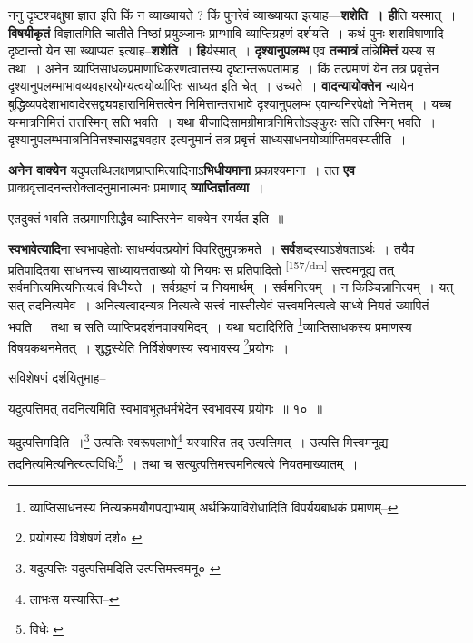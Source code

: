 \documentclass[article,12pt,a4paper]{memoir}
\begin{document}
	  \pstart ननु दृष्टश्चक्षुषा ज्ञात इति किं न व्याख्यायते ? किं पुनरेवं व्याख्यायत इत्याह—\textbf{शशेति । ही}ति यस्मात् । \textbf{विषयीकृतं} विज्ञातमिति चातीते निष्ठां प्रयुञ्जानः प्राग्भावि व्याप्तिग्रहणं दर्शयति । कथं पुनः शशविषाणादि दृष्टान्तो येन सा ख्याप्यत इत्याह--\textbf{शशेति} । \textbf{हि}र्यस्मात् । \textbf{दृश्यानुपलम्भ} एव \textbf{तन्मात्रं} तन्नि\textbf{मित्तं} यस्य स तथा । अनेन व्याप्तिसाधकप्रमाणाधिकरणत्वात्तस्य दृष्टान्तरूपतामाह । किं तत्प्रमाणं येन तत्र प्रवृत्तेन दृश्यानुपलम्भाभावव्यवहारयोग्यत्वयोर्व्याप्तिः साध्यत इति चेत् । उच्यते । \textbf{वादन्यायोक्तेन} न्यायेन बुद्धिव्यपदेशाभावादेरसद्व्यवहारानिमित्तत्वेन निमित्तान्तराभावे दृश्यानुपलम्भ एवान्यनिरपेक्षो निमित्तम् । यच्च यन्मात्रनिमित्तं तत्तस्मिन् सति भवति । यथा बीजादिसामग्रीमात्रनिमित्तोऽङ्कुरः सति तस्मिन् भवति । दृश्यानुपलम्भमात्रनिमित्तश्चासद्व्यवहार इत्यनुमानं तत्र प्रबृत्तं साध्यसाधनयोर्व्याप्तिमवस्यतीति ।
	\pend
      

	  \pstart \textbf{अनेन वाक्येन} यदुपलब्धिलक्षणप्राप्तमित्यादिनाऽ\textbf{भिधीयमाना} प्रकाश्यमाना । तत \textbf{एव} प्राक्प्रवृत्तादनन्तरोक्तादनुमानात्मनः प्रमाणाद् \textbf{व्याप्तिर्ज्ञातव्या} ।
	\pend
      

	  \pstart एतदुक्तं भवति तत्प्रमाणसिद्धैव व्याप्तिरनेन वाक्येन स्मर्यत इति ॥
	\pend
      

	  \pstart \textbf{स्वभावेत्यादि}ना स्वभावहेतोः साधर्म्यवत्प्रयोगं विवरितुमुपक्रमते । \textbf{सर्व}शब्दस्याऽशेषताऽर्थः । तयैव प्रतिपादितया साधनस्य साध्यायत्तताख्यो यो नियमः स प्रतिपादितो  \leavevmode\textsuperscript{\rmlatinfont\tiny [157/dm]} सत्त्वमनूद्य तत् सर्वमनित्यमित्यनित्यत्वं विधीयते । सर्वग्रहणं च नियमार्थम् । सर्वमनित्यम् । न किञ्चिन्नानित्यम् । यत् सत् तदनित्यमेव । अनित्यत्वादन्यत्र नित्यत्वे सत्त्वं नास्तीत्येवं सत्त्वमनित्यत्वे साध्ये नियतं ख्यापितं भवति । तथा च सति व्याप्तिप्रदर्शनवाक्यमिदम् । यथा घटादिरिति \footnote{व्याप्तिसाधनस्य \cite{dp-msA} \cite{dp-msB} \cite{dp-msC} \cite{dp-msD} \cite{dp-edP} \cite{dp-edH} \cite{dp-edE} \cite{dp-edN} नित्यक्रमयौगपद्याभ्याम् अर्थक्रियाविरोधादिति विपर्ययबाधकं प्रमाणम्--\cite{dp-msD-n}}व्याप्तिसाधकस्य प्रमाणस्य विषयकथनमेतत् । शुद्धस्येति निर्विशेषणस्य स्वभावस्य \footnote{प्रयोगस्य विशेषणं दर्श० \cite{dp-msB}}प्रयोगः ।
	\pend
      

	  \pstart सविशेषणं दर्शयितुमाह--
	\pend
      

	  \pstart यदुत्पत्तिमत् तदनित्यमिति स्वभावभूतधर्मभेदेन स्वभावस्य प्रयोगः ॥ १० ॥
	\pend
      

	  \pstart यदुत्पत्तिमदिति ।\footnote{यदुत्पत्तिः \cite{dp-msC} यदुत्पत्तिमदिति उत्पत्तिमत्त्वमनू० \cite{dp-msA}} उत्पतिः स्वरूपलाभो\footnote{लाभःस यस्यास्ति--\cite{dp-msB}} यस्यास्ति तद् उत्पत्तिमत् । उत्पत्ति मित्त्वमनूद्य तदनित्यमित्यनित्यत्वविधिः\footnote{विधेः \cite{dp-msA} \cite{dp-edP} \cite{dp-edH}} । तथा च सत्युत्पत्तिमत्त्वमनित्यत्वे नियतमाख्यातम् ।
	\pend
       
\end{document}
